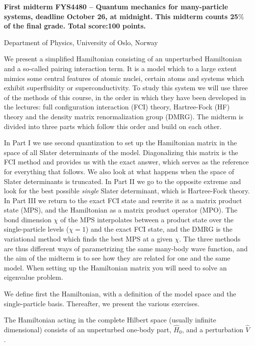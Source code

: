 \documentclass[prc]{revtex4} \usepackage[dvips]{graphicx}
\begin{document}
\begin{center}
{\LARGE\bf
First midterm FYS4480 – Quantum mechanics for many-particle systems, deadline October 26, at midnight. This midterm counts 25$\%$ of the final grade. Total score:100 points.}
\end{center}
\begin{center}
\centerline{{\small Department of Physics, University of Oslo, Norway}}
\end{center}


We present a simplified Hamiltonian consisting of an unperturbed
Hamiltonian and a so-called pairing interaction term. It is a model
which to a large extent mimics some central features of atomic
nuclei, certain atoms and systems which exhibit superfluidity or
superconductivity.  To study this system we will use three of the
methods of this course, in the order in which they have been
developed in the lectures: full configuration interaction (FCI)
theory, Hartree-Fock (HF) theory and the density matrix
renormalization group (DMRG). The midterm is divided into three parts
which follow this order and build on each other.

In Part I we use second quantization to set up the Hamiltonian matrix
in the space of all Slater determinants of the model. Diagonalizing
this matrix is the FCI method and provides us with the exact answer,
which serves as the reference for everything that follows. We also
look at what happens when the space of Slater determinants is
truncated. In Part II we go to the opposite extreme and look for the
best possible \emph{single} Slater determinant, which is Hartree-Fock
theory. In Part III we return to the exact FCI state and rewrite it as
a matrix product state (MPS), and the Hamiltonian as a matrix product
operator (MPO). The bond dimension $\chi$ of the MPS interpolates
between a product state over the single-particle levels ($\chi=1$) and
the exact FCI state, and the DMRG is the variational method which
finds the best MPS at a given $\chi$. The three methods are thus
different ways of parametrizing the same many-body wave function, and
the aim of the midterm is to see how they are related for one and the
same model.  When setting up the Hamiltonian matrix you will need to
solve an eigenvalue problem.

We define first the Hamiltonian, with a definition of the model space
and the single-particle basis. Thereafter, we present the various
exercises.


The Hamiltonian acting in the complete Hilbert space (usually infinite
dimensional) consists of an unperturbed one-body part, $\hat{H}_0$,
and a perturbation $\hat{V}$.
\end{document}
